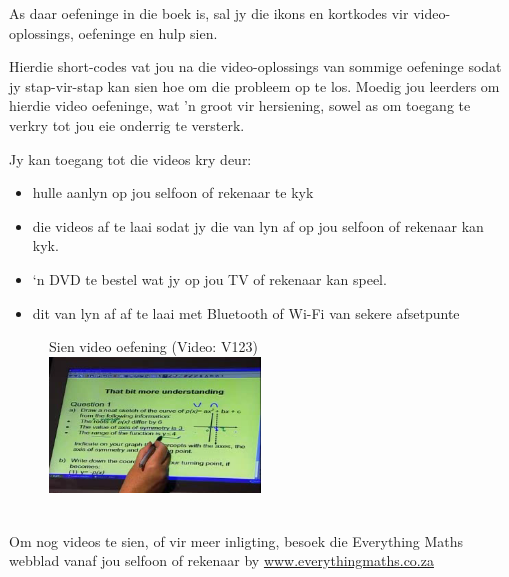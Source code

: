 {\Large
As daar oefeninge in die boek is, sal jy die ikons en kortkodes vir video-oplossings, oefeninge en hulp sien. 

Hierdie short-codes vat jou na die video-oplossings van sommige oefeninge sodat jy stap-vir-stap kan sien hoe om die probleem op te los. Moedig jou leerders om hierdie video oefeninge, wat 'n groot vir hersiening, sowel as om toegang te verkry tot jou eie onderrig te versterk.

Jy kan toegang tot die videos kry deur:
\begin{itemize}[noitemsep]
\item hulle aanlyn op jou selfoon of rekenaar te kyk
\item die videos af te laai sodat jy die van lyn af op jou selfoon of rekenaar kan kyk.
\item ‘n DVD te bestel wat jy op jou TV of rekenaar kan speel.
\item dit van lyn af af te laai met Bluetooth of Wi-Fi van sekere afsetpunte
\end{itemize}
\begin{figure}[H]
\begin{center}
Sien video oefening  (Video: V123)\\ 
\includegraphics[width=0.5\textwidth]{../title_images/mindsetexercise.png}
\end{center}
\end{figure}
\\
Om nog videos te sien, of vir meer inligting, besoek die Everything Maths webblad vanaf jou selfoon of rekenaar by \underline{www.everythingmaths.co.za}    \par


\vspace*{1cm}
}


